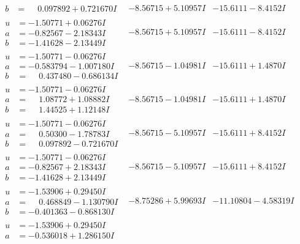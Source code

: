 \documentclass[1p]{elsarticle_modified}
\theoremstyle{definition}
\begin{document}
$$\begin{array}{c|c|c}
\begin{aligned}
b &= \phantom{-}0.097892 + 0.721670 I\end{aligned}
 & -8.56715 + 5.10957 I & -15.6111 - 8.4152 I \\ \hline\begin{aligned}
u &= -1.50771 + 0.06276 I \\
a &= -0.82567 - 2.18343 I \\
b &= -1.41628 - 2.13449 I\end{aligned}
 & -8.56715 + 5.10957 I & -15.6111 - 8.4152 I \\ \hline\begin{aligned}
u &= -1.50771 - 0.06276 I \\
a &= -0.583794 - 1.007180 I \\
b &= \phantom{-}0.437480 - 0.686134 I\end{aligned}
 & -8.56715 - 1.04981 I & -15.6111 + 1.4870 I \\ \hline\begin{aligned}
u &= -1.50771 - 0.06276 I \\
a &= \phantom{-}1.08772 + 1.08882 I \\
b &= \phantom{-}1.44525 + 1.12148 I\end{aligned}
 & -8.56715 - 1.04981 I & -15.6111 + 1.4870 I \\ \hline\begin{aligned}
u &= -1.50771 - 0.06276 I \\
a &= \phantom{-}0.50300 - 1.78783 I \\
b &= \phantom{-}0.097892 - 0.721670 I\end{aligned}
 & -8.56715 - 5.10957 I & -15.6111 + 8.4152 I \\ \hline\begin{aligned}
u &= -1.50771 - 0.06276 I \\
a &= -0.82567 + 2.18343 I \\
b &= -1.41628 + 2.13449 I\end{aligned}
 & -8.56715 - 5.10957 I & -15.6111 + 8.4152 I \\ \hline\begin{aligned}
u &= -1.53906 + 0.29450 I \\
a &= \phantom{-}0.468849 - 1.130790 I \\
b &= -0.401363 - 0.868130 I\end{aligned}
 & -8.75286 + 5.99693 I & -11.10804 - 4.58319 I \\ \hline\begin{aligned}
u &= -1.53906 + 0.29450 I \\
a &= -0.536018 + 1.286150 I \\

\end{aligned}
\end{array}$$
\end{document}
